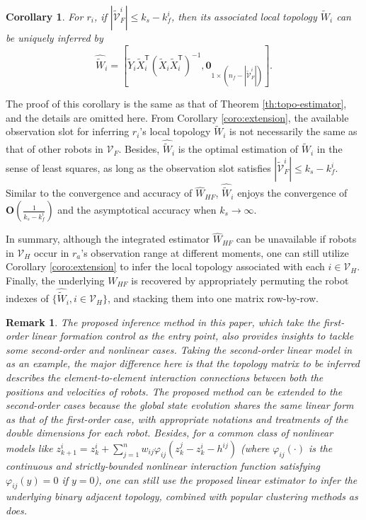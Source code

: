 \documentclass[12pt,journal,draftclsnofoot,onecolumn]{IEEEtran}
\newtheorem{remark}{Remark}
\newtheorem{corollary}{Corollary}
\let \sss=\scriptscriptstyle
\begin{document}
{{\begin{corollary}
For $r_i$, if $|\tilde{\mathcal{V}}_{\sss F}^{i}| \le k_s-k_f^i$, then its associated local topology $\tilde{W}_{i}$ can be uniquely inferred by 
\begin{equation}
\hat{\tilde{W}}_{i}=[\tilde{Y}_i \tilde{X}_{i}^\mathsf{T} ( \tilde{X}_i \tilde{X}_i^\mathsf{T})^{-1},\bm{0}_{1\times (n_f-|\tilde{\mathcal{V}}_{\sss F}^{i}|)}]. 
\end{equation}
\end{corollary}
The proof of this corollary is the same as that of Theorem \ref{th:topo-estimator}, and the details are omitted here. 
From Corollary \ref{coro:extension}, the available observation slot for inferring $r_i$'s local topology ${\tilde{W}}_{i}$ is not necessarily the same as that of other robots in $\mathcal{V}_{\sss F}$. 
Besides, $\hat{\tilde{W}}_{i}$ is the optimal estimation of ${\tilde{W}}_{i}$ in the sense of least squares, as long as the observation slot satisfies $|\tilde{\mathcal{V}}_{\sss F}^{i}| \le k_s-k_f^i$. 
Similar to the convergence and accuracy of $\hat W_{\sss HF}$, $\hat{\tilde{W}}_{i}$ enjoys the convergence of $\bm{O} ( \frac{1}{k_s-k_f^i})$ and the asymptotical accuracy when $k_s\to\infty$. 

In summary, although the integrated estimator $\hat W_{\sss HF}$ can be unavailable if robots in $\mathcal{V}_{\sss H}$ occur in $r_a$'s observation range at different moments, 
one can still utilize Corollary \ref{coro:extension} to infer the local topology associated with each $i\in\mathcal{V}_{\sss H}$. 
Finally, the underlying $W_{\sss HF}$ is recovered by appropriately permuting the robot indexes of $\{ \hat{\tilde{W}}_{i}, i\in\mathcal{V}_{\sss H} \}$, and stacking them into one matrix row-by-row.  



\begin{remark}
The proposed inference method in this paper, which take the first-order linear formation control as the entry point, also provides insights to tackle some second-order and nonlinear cases. 
Taking the second-order linear model in \cite{cao2010sampled} as an example, 
the major difference here is that the topology matrix to be inferred describes the element-to-element interaction connections between both the positions and velocities of robots. 
The proposed method can be extended to the second-order cases because the global state evolution shares the same linear form as that of the first-order case, with appropriate notations and treatments of the double dimensions for each robot. 
Besides, for a common class of nonlinear models like $ z_{k+1}^{i}=z_{k}^{i}+ \sum\nolimits_{j = 1}^{n} w_{ij}\varphi_{ij}( z_{k}^{j}-z_{k}^{i}-h^{ij})$ (where $\varphi_{ij}(\cdot)$ is the continuous and strictly-bounded nonlinear interaction function satisfying $\varphi_{ij}(y)=0$ if $y=0$), one can still use the proposed linear estimator to infer the underlying binary adjacent topology, combined with popular clustering methods as \cite{santos2019local} does. 
\end{remark}


}}
\end{document}

